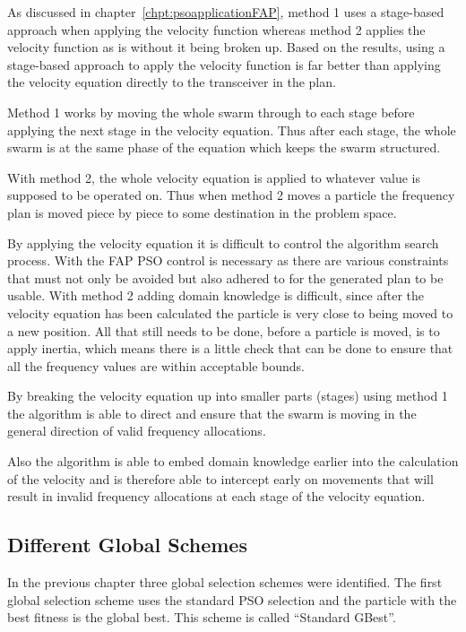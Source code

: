 As discussed in chapter~\ref{chpt:psoapplicationFAP}, method 1 uses a stage-based approach when applying the velocity function whereas method 2 applies the velocity function as is without it being broken up. Based on the results, using a stage-based approach to apply the velocity function is far better than applying the velocity equation directly to the transceiver in the plan.

Method 1 works by moving the whole swarm through to each stage before applying the next stage in the velocity equation. Thus after each stage, the whole swarm is at the same phase of the equation which keeps the swarm structured.

With method 2, the whole velocity equation is applied to whatever value is supposed to be operated on. Thus when method 2 moves a particle the frequency plan is moved piece by piece to some destination in the problem space.

By applying the velocity equation it is difficult to control the algorithm search process. With the FAP PSO control is necessary as there are various constraints that must not only be avoided but also adhered to for the generated plan to be usable. With method 2 adding domain knowledge is difficult, since after the velocity equation has been calculated the particle is very close to being moved to a new position. All that still needs to be done, before a particle is moved, is to apply inertia, which means there is a little check that can be done to ensure that all the frequency values are within acceptable bounds.

By breaking the velocity equation up into smaller parts (stages) using method 1 the algorithm is able to direct and ensure that the swarm is moving in the general direction of valid frequency allocations.

Also the algorithm is able to embed domain knowledge earlier into the calculation of the velocity and is therefore able to intercept early on movements that will result in invalid frequency allocations at each stage of the velocity equation.

\subsection{Different Global Schemes}
\label{sec:diffglobalschemes}
In the previous chapter three global selection schemes were identified. The first global selection scheme uses the standard PSO selection and the particle with the best fitness is the global best. This scheme is called ``Standard GBest''.

